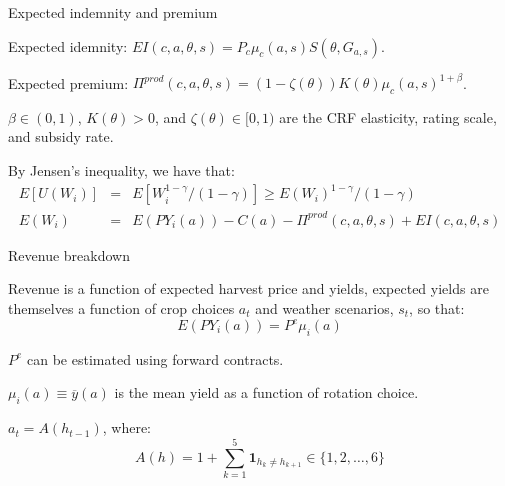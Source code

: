 \documentclass[notes,11pt, aspectratio=169]{beamer}
\newenvironment{wideitemize}{\itemize\addtolength{\itemsep}{10pt}}{\enditemize}
\begin{document}
\begin{frame}{Expected indemnity and premium}
    \begin{wideitemize}
        \item Expected idemnity: $EI(c,a,\theta,s)=P_{c}\mu_{c}(a,s)S(\theta,G_{a,s})$.
        \item Expected premium: $\Pi^{prod}(c,a,\theta,s)=(1-\zeta(\theta))K(\theta)\mu_{c}(a,s)^{1+\beta}$.
        \item $\beta\in(0,1)$, $K(\theta)>0$, and $\zeta(\theta)\in [0,1)$ are the CRF elasticity, rating scale, and subsidy rate.
        \item By Jensen's inequality, we have that:
        \begin{eqnarray}
        E\left[U(W_{i})\right] &=& E\left[W_{i}^{1-\gamma}/(1-\gamma)\right] \geq E(W_{i})^{1-\gamma}/(1-\gamma)\\
        E(W_{i}) &=& E(PY_{i}(a))-C(a)-\Pi^{prod}(c,a,\theta,s)+EI(c,a,\theta,s)
        \end{eqnarray}
    \end{wideitemize}
\end{frame}

\begin{frame}{Revenue breakdown}

    \begin{wideitemize}
        \item Revenue is a function of expected harvest price and yields, expected yields are themselves a function of crop choices $a_{t}$ and weather scenarios, $s_{t}$, so that:
        \begin{equation}
           E(PY_{i}(a)) = P^{e}\mu_{i}(a)
        \end{equation}
        \item $P^{e}$ can be estimated using forward contracts.
        \item $\mu_{i}(a) \equiv \overline{y}(a)$ is the mean yield as a function of rotation choice.
        \item $a_{t}=A(h_{t-1})$, where:
        \begin{equation}
            A(h)=1+\sum_{k=1}^{5}\mathbf{1}_{h_{k}\neq h_{k+1}} \in \{1,2,\dots,6\}
        \end{equation}
    \end{wideitemize}
\end{frame}  
\end{document}
